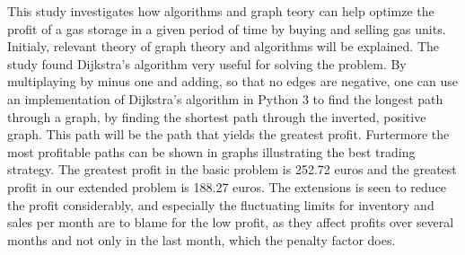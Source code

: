 This study investigates how algorithms and graph teory can help optimze the profit of a gas storage in a given period of time by buying and selling gas units.
Initialy, relevant theory of graph theory and algorithms will be explained. The study found Dijkstra's algorithm very useful for solving the problem. By multiplaying by minus one and adding, so that no edges are negative, one can use an implementation of Dijkstra's algorithm in Python 3 to find the longest path through a graph, by finding the shortest path through the inverted, positive graph. This path will be the path that yields the greatest profit. Furtermore the most profitable paths can be shown in graphs illustrating the best trading strategy. The greatest profit in the basic problem is 252.72 euros and the greatest profit in our extended problem is 188.27 euros. 
The extensions is seen to reduce the profit considerably, and  especially the fluctuating limits for inventory and sales per month are to blame for the low profit, as they affect profits over several months and not only in the last month, which the penalty factor does. 

